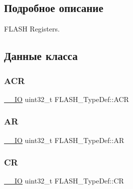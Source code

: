 \subsection{Подробное описание}
F\+L\+A\+SH Registers. 

\subsection{Данные класса}
\mbox{\label{struct_f_l_a_s_h___type_def_aaf432a8a8948613f4f66fcace5d2e5fe}} 
\subsubsection{\texorpdfstring{ACR}{ACR}}
{\footnotesize\ttfamily \mbox{\hyperlink{group___c_m_s_i_s___c_m3__core__definitions_gaec43007d9998a0a0e01faede4133d6be}{\+\_\+\+\_\+\+IO}} uint32\+\_\+t F\+L\+A\+S\+H\+\_\+\+Type\+Def\+::\+A\+CR}

\mbox{\label{struct_f_l_a_s_h___type_def_a9cd77bc29038841798b4b63c5cecdb9d}} 
\subsubsection{\texorpdfstring{AR}{AR}}
{\footnotesize\ttfamily \mbox{\hyperlink{group___c_m_s_i_s___c_m3__core__definitions_gaec43007d9998a0a0e01faede4133d6be}{\+\_\+\+\_\+\+IO}} uint32\+\_\+t F\+L\+A\+S\+H\+\_\+\+Type\+Def\+::\+AR}

\mbox{\label{struct_f_l_a_s_h___type_def_a7919306d0e032a855200420a57f884d7}} 
\subsubsection{\texorpdfstring{CR}{CR}}
{\footnotesize\ttfamily \mbox{\hyperlink{group___c_m_s_i_s___c_m3__core__definitions_gaec43007d9998a0a0e01faede4133d6be}{\+\_\+\+\_\+\+IO}} uint32\+\_\+t F\+L\+A\+S\+H\+\_\+\+Type\+Def\+::\+CR}

\mbox{\label{struct_f_l_a_s_h___type_def_a802e9a26a89b44decd2d32d97f729dd3}} 
